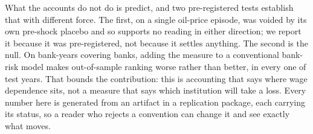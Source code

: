 What the accounts do not do is predict, and two pre-registered tests establish that with
different force. The first, on a single oil-price episode, was voided by its own pre-shock
placebo and so supports no reading in either direction; we report it because it was
pre-registered, not because it settles anything. The second is the null. On
 bank-years covering  banks, adding the measure to a
conventional bank-risk model makes out-of-sample ranking worse rather than better, in every one
of  test years. That bounds the contribution:
this is accounting that says where wage dependence sits, not a measure that says which
institution will take a loss. Every number here is generated from an artifact in a
replication package, each carrying its status, so a reader who rejects a convention can change it
and see exactly what moves.
